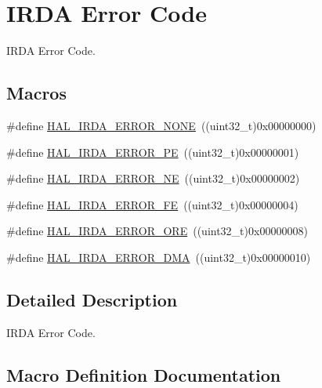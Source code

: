 \hypertarget{group___i_r_d_a___error___code}{}\section{I\+R\+DA Error Code}
\label{group___i_r_d_a___error___code}


I\+R\+DA Error Code.  


\subsection*{Macros}
\begin{DoxyCompactItemize}
\item 
\#define \hyperlink{group___i_r_d_a___error___code_ga5e2f0a4853b89feb89395d6447c7278c}{H\+A\+L\+\_\+\+I\+R\+D\+A\+\_\+\+E\+R\+R\+O\+R\+\_\+\+N\+O\+NE}~((uint32\+\_\+t)0x00000000)
\item 
\#define \hyperlink{group___i_r_d_a___error___code_ga6d09c3b0aa03defa115a9b35b4b11d15}{H\+A\+L\+\_\+\+I\+R\+D\+A\+\_\+\+E\+R\+R\+O\+R\+\_\+\+PE}~((uint32\+\_\+t)0x00000001)
\item 
\#define \hyperlink{group___i_r_d_a___error___code_ga96fa3b5489256dc0a05d6d7008b7bc36}{H\+A\+L\+\_\+\+I\+R\+D\+A\+\_\+\+E\+R\+R\+O\+R\+\_\+\+NE}~((uint32\+\_\+t)0x00000002)
\item 
\#define \hyperlink{group___i_r_d_a___error___code_gac4cc028071c9f67eadfb1ea272f61b07}{H\+A\+L\+\_\+\+I\+R\+D\+A\+\_\+\+E\+R\+R\+O\+R\+\_\+\+FE}~((uint32\+\_\+t)0x00000004)
\item 
\#define \hyperlink{group___i_r_d_a___error___code_ga452db15804671ee712e2943fb7eebbc8}{H\+A\+L\+\_\+\+I\+R\+D\+A\+\_\+\+E\+R\+R\+O\+R\+\_\+\+O\+RE}~((uint32\+\_\+t)0x00000008)
\item 
\#define \hyperlink{group___i_r_d_a___error___code_ga3283f5c73025352c4933d3c42f9ef77d}{H\+A\+L\+\_\+\+I\+R\+D\+A\+\_\+\+E\+R\+R\+O\+R\+\_\+\+D\+MA}~((uint32\+\_\+t)0x00000010)
\end{DoxyCompactItemize}


\subsection{Detailed Description}
I\+R\+DA Error Code. 



\subsection{Macro Definition Documentation}
